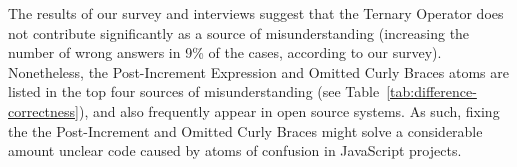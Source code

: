 The results of our survey and interviews suggest that the
Ternary Operator does not contribute significantly as a source of
misunderstanding (increasing the number of wrong answers in 9\% of the cases,
according to our survey). Nonetheless, the Post-Increment Expression
and Omitted Curly Braces atoms are listed in the top four sources of misunderstanding 
(see Table~\ref{tab:difference-correctness}), and also frequently appear
in open source systems. As such, fixing the
the Post-Increment and Omitted Curly Braces might solve a considerable
amount unclear code caused by atoms of confusion in
JavaScript projects. 
